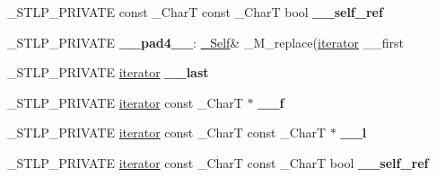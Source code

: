 \begin{DoxyCompactItemize}
\+\_\+\+S\+T\+L\+P\+\_\+\+P\+R\+I\+V\+A\+TE const \+\_\+\+CharT const \+\_\+\+CharT bool {\bfseries \+\_\+\+\_\+self\+\_\+ref}
\item 
\mbox{\label{classbasic__string_ae1e0a4a45e5568234a3555a0cf18f1b9}} 
\+\_\+\+S\+T\+L\+P\+\_\+\+P\+R\+I\+V\+A\+TE {\bfseries \+\_\+\+\_\+pad4\+\_\+\+\_\+}\+: \hyperlink{classbasic__string}{\+\_\+\+Self}\& \+\_\+\+M\+\_\+replace(\hyperlink{structiterator}{iterator} \+\_\+\+\_\+first
\item 
\mbox{\label{classbasic__string_ad5bb82eb5022df68ba4101c4dca23a4e}} 
\+\_\+\+S\+T\+L\+P\+\_\+\+P\+R\+I\+V\+A\+TE \hyperlink{structiterator}{iterator} {\bfseries \+\_\+\+\_\+last}
\item 
\mbox{\label{classbasic__string_ae87a4649f1ef902fba43d2f523d9b40f}} 
\+\_\+\+S\+T\+L\+P\+\_\+\+P\+R\+I\+V\+A\+TE \hyperlink{structiterator}{iterator} const \+\_\+\+CharT $\ast$ {\bfseries \+\_\+\+\_\+f}
\item 
\mbox{\label{classbasic__string_a7ecb6d31a85922efb32c830b0e8601e9}} 
\+\_\+\+S\+T\+L\+P\+\_\+\+P\+R\+I\+V\+A\+TE \hyperlink{structiterator}{iterator} const \+\_\+\+CharT const \+\_\+\+CharT $\ast$ {\bfseries \+\_\+\+\_\+l}
\item 
\mbox{\label{classbasic__string_a821ef2a795b51b0cea69cdc37a3fac46}} 
\+\_\+\+S\+T\+L\+P\+\_\+\+P\+R\+I\+V\+A\+TE \hyperlink{structiterator}{iterator} const \+\_\+\+CharT const \+\_\+\+CharT bool {\bfseries \+\_\+\+\_\+self\+\_\+ref}
\end{DoxyCompactItemize}
